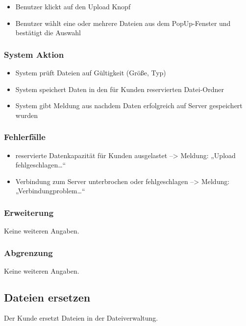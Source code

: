 \documentclass[a4paper,12pt]{article}
\begin{document}
\begin{itemize}

\item
  Benutzer klickt auf den Upload Knopf
\item
  Benutzer wählt eine oder mehrere Dateien aus dem PopUp-Fenster und
  bestätigt die Auswahl
\end{itemize}

\subsubsection{System Aktion}\label{system-aktion-11}

\begin{itemize}

\item
  System prüft Dateien auf Gültigkeit (Größe, Typ)
\item
  System speichert Daten in den für Kunden reservierten Datei-Ordner
\item
  System gibt Meldung aus nachdem Daten erfolgreich auf Server
  gespeichert wurden
\end{itemize}

\subsubsection{Fehlerfälle}\label{fehlerfalle-11}

\begin{itemize}

\item
  reservierte Datenkapazität für Kunden ausgelastet --\textgreater{}
  Meldung: „Upload fehlgeschlagen\ldots{}``
\item
  Verbindung zum Server unterbrochen oder fehlgeschlagen
  --\textgreater{} Meldung: „Verbindungproblem\ldots{}``
\end{itemize}

\subsubsection{Erweiterung}\label{erweiterung-11}
Keine weiteren Angaben.

\subsubsection{Abgrenzung}\label{abgrenzung-11}
Keine weiteren Angaben.

\clearpage

\subsection{Dateien ersetzen}\label{dateien-ersetzen-produkt-kunden--bilderpdfs}
Der Kunde ersetzt Dateien in der Dateiverwaltung.
\end{document}
